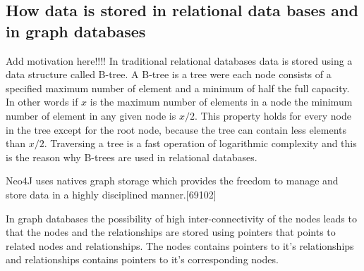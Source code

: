 \subsection{How data is stored in relational data bases and in graph databases}
Add motivation here!!!!
In traditional relational databases data is stored using a data structure called B-tree. A B-tree is a tree were each node consists of a specified maximum number of element and a minimum of half the full capacity. In other words if $x$ is the maximum number of elements in a node the minimum number of element in any given node is $x/2$. This property holds for every node in the tree except for the root node, because the tree can contain less elements than $x/2$. Traversing a tree is a fast operation of logarithmic complexity and this is the reason why B-trees are used in relational databases. 

Neo4J uses natives graph storage which provides the freedom to manage and store data in a highly disciplined manner.[69102]  

In graph databases the possibility of high inter-connectivity of the nodes leads to that the nodes and the relationships are stored using pointers that points to related nodes and relationships. The nodes contains pointers to it's relationships and relationships contains pointers to it's corresponding nodes. 